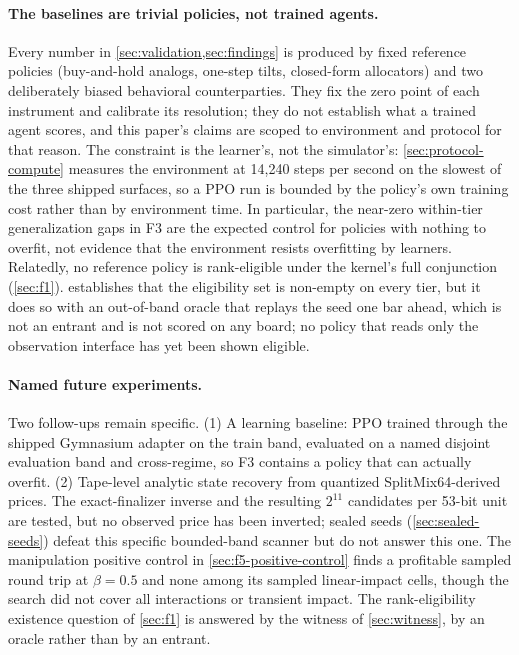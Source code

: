 \paragraph{The baselines are trivial policies, not trained agents.} Every number in \cref{sec:validation,sec:findings} is produced by fixed reference policies (buy-and-hold analogs, one-step tilts, closed-form allocators) and two deliberately biased behavioral counterparties. They fix the zero point of each instrument and calibrate its resolution; they do not establish what a trained agent scores, and this paper's claims are scoped to environment and protocol for that reason. The constraint is the learner's, not the simulator's: \cref{sec:protocol-compute} measures the environment at 14{,}240 steps per second on the slowest of the three shipped surfaces, so a PPO run is bounded by the policy's own training cost rather than by environment time. In particular, the near-zero within-tier generalization gaps in F3 are the expected control for policies with nothing to overfit, not evidence that the environment resists overfitting by learners. Relatedly, no reference policy is rank-eligible under the kernel's full conjunction (\cref{sec:f1}).  establishes that the eligibility set is non-empty on every tier, but it does so with an out-of-band oracle that replays the seed one bar ahead, which is not an entrant and is not scored on any board; no policy that reads only the observation interface has yet been shown eligible.

\paragraph{Named future experiments.} Two follow-ups remain specific. (1) A learning baseline: PPO trained through the shipped Gymnasium adapter on the train band, evaluated on a named disjoint evaluation band and cross-regime, so F3 contains a policy that can actually overfit. (2) Tape-level analytic state recovery from quantized SplitMix64-derived prices. The exact-finalizer inverse and the resulting $2^{11}$ candidates per 53-bit unit are tested, but no observed price has been inverted; sealed seeds (\cref{sec:sealed-seeds}) defeat this specific bounded-band scanner but do not answer this one. The manipulation positive control in \cref{sec:f5-positive-control} finds a profitable sampled round trip at $\beta = 0.5$ and none among its sampled linear-impact cells, though the search did not cover all interactions or transient impact. The rank-eligibility existence question of \cref{sec:f1} is answered by the witness of \cref{sec:witness}, by an oracle rather than by an entrant.

